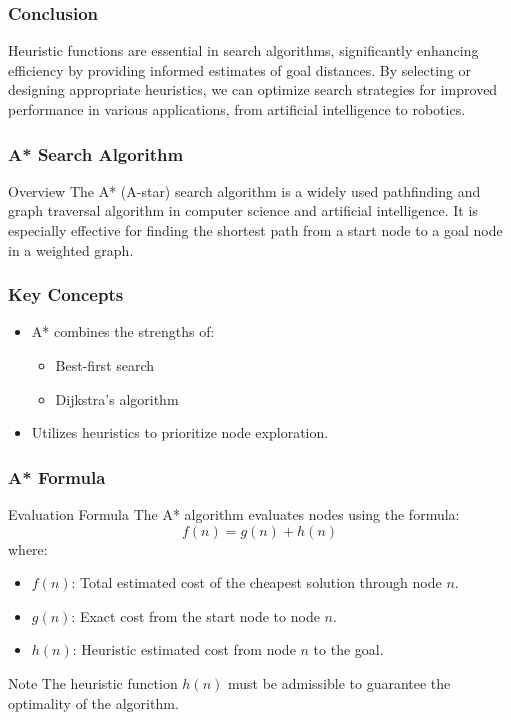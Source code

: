 \documentclass[aspectratio=169]{beamer}
\begin{document}
\begin{frame}[fragile]
    \frametitle{Conclusion}
    Heuristic functions are essential in search algorithms, significantly enhancing efficiency by providing informed estimates of goal distances. 
    By selecting or designing appropriate heuristics, we can optimize search strategies for improved performance in various applications, from artificial intelligence to robotics.
\end{frame}

\begin{frame}[fragile]
    \frametitle{A* Search Algorithm}
    \begin{block}{Overview}
        The A* (A-star) search algorithm is a widely used pathfinding and graph traversal algorithm in computer science and artificial intelligence.
        It is especially effective for finding the shortest path from a start node to a goal node in a weighted graph.
    \end{block}
\end{frame}

\begin{frame}[fragile]
    \frametitle{Key Concepts}
    \begin{itemize}
        \item A* combines the strengths of:
        \begin{itemize}
            \item Best-first search
            \item Dijkstra's algorithm
        \end{itemize}
        \item Utilizes heuristics to prioritize node exploration.
    \end{itemize}
\end{frame}

\begin{frame}[fragile]
    \frametitle{A* Formula}
    \begin{block}{Evaluation Formula}
        The A* algorithm evaluates nodes using the formula:
        \begin{equation}
            f(n) = g(n) + h(n)
        \end{equation}
        where:
        \begin{itemize}
            \item \( f(n) \): Total estimated cost of the cheapest solution through node \(n\).
            \item \( g(n) \): Exact cost from the start node to node \(n\).
            \item \( h(n) \): Heuristic estimated cost from node \(n\) to the goal.
        \end{itemize}
    \end{block}
    \begin{block}{Note}
        The heuristic function \(h(n)\) must be admissible to guarantee the optimality of the algorithm.
    \end{block}
\end{frame}
\end{document}
